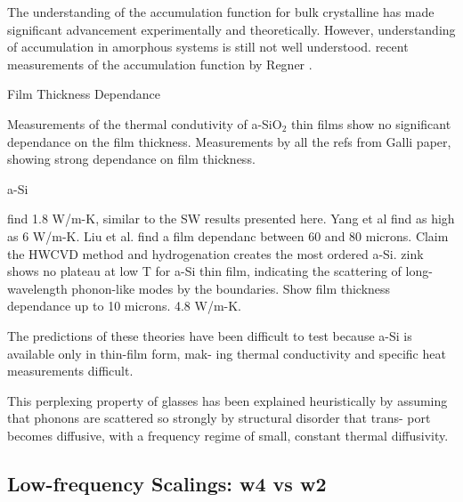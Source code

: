 \documentclass[aps,prb,twocolumn,superscriptaddress,footinbib,amsmath,amssymb,floatfix]{revtex4}
\begin{document}
The understanding of the accumulation function for bulk 
crystalline has made significant advancement experimentally
\cite{minnich_thermal_2011}
and 
theoretically.\cite{yang_mean_2013} However, understanding 
of accumulation in amorphous systems is still not 
well understood.
\cite{feldman_thermal_1993,feldman_numerical_1999,he_thermal_2011}
recent measurements of the accumulation function by Regner .
\cite{regner_broadband_2013}

Film Thickness Dependance

Measurements of the thermal condutivity of a-SiO$_2$ thin 
films show no significant dependance on the film thickness. 
\cite{lee_heat_1997,yamane_measurement_2002} 
Measurements by all the refs from Galli paper, showing strong
dependance on film thickness.
\cite{wada_thermal_1996,zink_thermal_2006,yang_anomalously_2010,
cahill_thermal_1994,kuo_thermal_1992,moon_thermal_2002,liu_high_2009}

a-Si

\cite{wada_thermal_1996} find 1.8 W/m-K, similar to the SW results 
presented here.
Yang et al find as high as 6 W/m-K.\cite{yang_anomalously_2010}
Liu et al. find a film dependanc between 60 and 80 microns.
\cite{liu_high_2009} Claim the HWCVD method and hydrogenation 
creates the most ordered a-Si.
zink shows no plateau at low T for a-Si thin film, indicating 
the scattering of long-wavelength phonon-like modes 
by the boundaries.\cite{zink_thermal_2006}
Show film thickness dependance up to 10 microns.
\cite{kuo_thermal_1992}
4.8 W/m-K.\cite{hasselman_thermal_1989}


The predictions of these theories have been difficult to
test because a-Si is available only in thin-film form, mak-
ing thermal conductivity and specific heat measurements
difficult.

This perplexing property of glasses
has been explained heuristically by assuming that phonons
are scattered so strongly by structural disorder that trans-
port becomes diffusive, with a frequency regime of small,
constant thermal diffusivity.
\cite{kittel_interpretation_1949,sheng_heat_1991,allen_thermal_1993} 

\subsection{\label{S:Theory:Thermal}Low-frequency Scalings: w4 vs w2}
\end{document}
